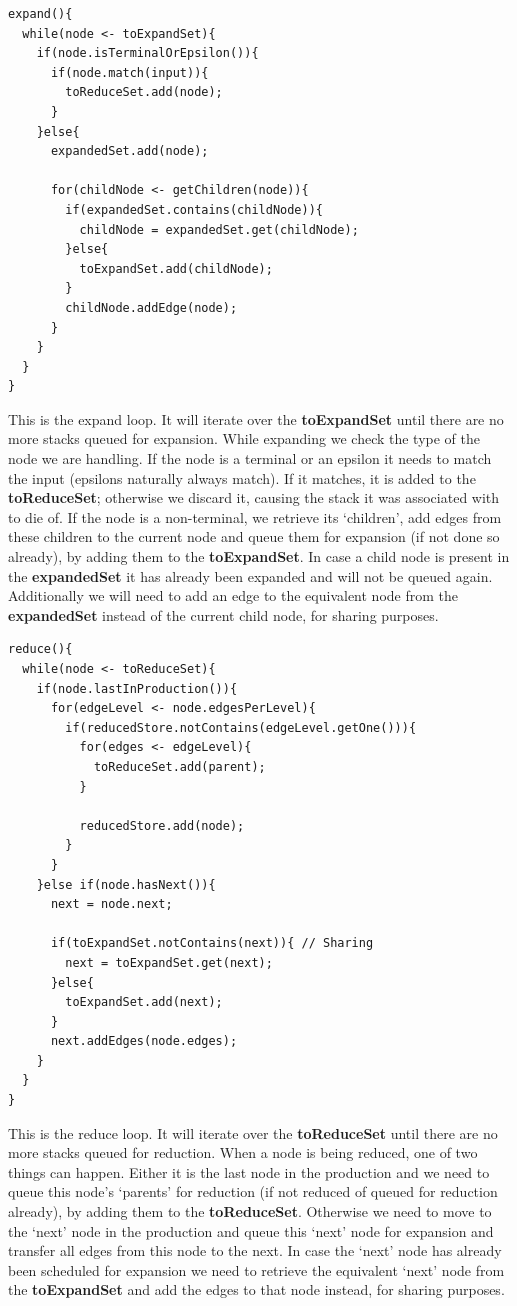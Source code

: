 \documentclass[a4paper,10pt]{article}
\begin{document}
{\small
\begin{verbatim}
expand(){
  while(node <- toExpandSet){
    if(node.isTerminalOrEpsilon()){
      if(node.match(input)){
        toReduceSet.add(node);
      }
    }else{
      expandedSet.add(node);
      
      for(childNode <- getChildren(node)){
        if(expandedSet.contains(childNode)){
          childNode = expandedSet.get(childNode);
        }else{
          toExpandSet.add(childNode);
        }
        childNode.addEdge(node);
      }
    }
  }
}
\end{verbatim}
}

This is the expand loop. It will iterate over the {\bf toExpandSet} until there are no more stacks queued for expansion. While expanding we check the type of the node we are handling. If the node is a terminal or an epsilon it needs to match the input (epsilons naturally always match). If it matches, it is added to the {\bf toReduceSet}; otherwise we discard it, causing the stack it was associated with to die of. If the node is a non-terminal, we retrieve its `children', add edges from these children to the current node and queue them for expansion (if not done so already), by adding them to the {\bf toExpandSet}. In case a child node is present in the {\bf expandedSet} it has already been expanded and will not be queued again. Additionally we will need to add an edge to the equivalent node from the {\bf expandedSet} instead of the current child node, for sharing purposes.

{\small
\begin{verbatim}
reduce(){
  while(node <- toReduceSet){
    if(node.lastInProduction()){
      for(edgeLevel <- node.edgesPerLevel){
        if(reducedStore.notContains(edgeLevel.getOne())){
          for(edges <- edgeLevel){
            toReduceSet.add(parent);
          }
          
          reducedStore.add(node);
        }
      }
    }else if(node.hasNext()){
      next = node.next;
      
      if(toExpandSet.notContains(next)){ // Sharing
        next = toExpandSet.get(next);
      }else{
        toExpandSet.add(next);
      }
      next.addEdges(node.edges);
    }
  }
}
\end{verbatim}
}

This is the reduce loop. It will iterate over the {\bf toReduceSet} until there are no more stacks queued for reduction. When a node is being reduced, one of two things can happen. Either it is the last node in the production and we need to queue this node's `parents' for reduction (if not reduced of queued for reduction already), by adding them to the {\bf toReduceSet}. Otherwise we need to move to the `next' node in the production and queue this `next' node for expansion and transfer all edges from this node to the next. In case the `next' node has already been scheduled for expansion we need to retrieve the equivalent `next' node from the {\bf toExpandSet} and add the edges to that node instead, for sharing purposes.
\end{document}

